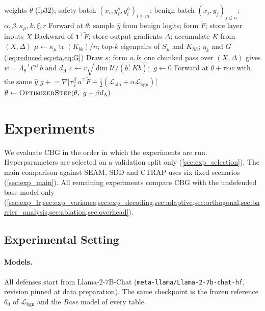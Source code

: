 \documentclass[11pt]{article}
\newcommand{\U}{\mathcal{U}}
\newcommand{\Laln}{\mathcal{L}_{\mathrm{aln}}}
\newcommand{\Lbgn}{\mathcal{L}_{\mathrm{bgn}}}
\newcommand{\Lam}{\Lambda_{\theta}}
\newcommand{\Ft}{\widetilde{F}}
\newcommand{\etak}{\eta_{k}}
\newcommand{\tr}{\operatorname{tr}}
\newcommand{\Smu}{S_{\mu}}
\newcommand{\tbd}{\textcolor{gray}{--}}
\begin{document}
\begin{algorithm}[t]
\caption{One CBG training step}
\label{alg:cbg}
\small
\begin{algorithmic}[1]
\Require weights $\theta$ (fp32); safety batch $(x_i,y_i^s,y_i^h)_{i\le m}$; benign batch $(x_j,y_j)_{j\le n}$; $\alpha,\beta,\kappa_\mu,k,\xi,r$
\State Forward at $\theta$; sample $\hat y$ from benign logits; form $\Ft$; store layer inputs $X$
\State Backward of $\mathbf 1^\top\Ft$; store output gradients $\Delta$; accumulate $K$ from $(X,\Delta)$
\State $\mu\gets\kappa_\mu\tr(K_{bb})/n$; top-$k$ eigenpairs of $\Smu$ and $K_{hh}$; $\etak$ and $G$ (\cref{eq:reduced,eq:eta,eq:G})
\State Draw $s$; form $a,b$; one chunked pass over $(X,\Delta)$ gives $w=\Lam^{-1}C^\top b$ and $d_\Lambda$
\State $\varepsilon\gets r\sqrt{\dim\U/(b^\top Kb)}$;\ $g\gets0$
  \State Forward at $\theta+\tau\varepsilon w$ with the same $\hat y$
  \State $g\mathrel{+}=\nabla\bigl[\tau\tfrac{\beta}{\varepsilon}\,a^\top\Ft+\tfrac12(\Laln+\alpha\Lbgn)\bigr]$
\EndFor
\State $\theta\gets\textsc{OptimizerStep}(\theta,\ g+\beta d_\Lambda)$
\end{algorithmic}
\end{algorithm}



\providecommand{\tbd}{--}

\section{Experiments}
\label{sec:experiments}

We evaluate CBG in the order in which the experiments are run. Hyperparameters are selected on a validation split only (\cref{sec:exp_selection}). The main comparison against SEAM, SDD and CTRAP uses six fixed scenarios (\cref{sec:exp_main}). All remaining experiments compare CBG with the undefended base model only (\cref{sec:exp_lr,sec:exp_variance,sec:exp_decoding,sec:adaptive,sec:orthogonal,sec:barrier_analysis,sec:ablation,sec:overhead}).



\subsection{Experimental Setting}
\label{sec:setting}

\paragraph{Models.}
All defenses start from Llama-2-7B-Chat (\texttt{meta-llama/Llama-2-7b-chat-hf}, revision pinned at data preparation). The same checkpoint is the frozen reference $\theta_0$ of $\Lbgn$ and the \emph{Base} model of every table.
\end{document}
